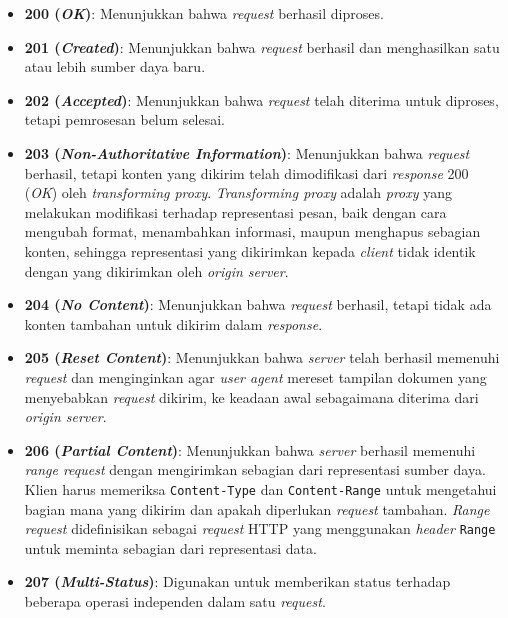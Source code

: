 \begin{itemize}
    \item \textbf{200 (\textit{OK})}: Menunjukkan bahwa \textit{request} berhasil diproses.
  
    \item \textbf{201 (\textit{Created})}: Menunjukkan bahwa \textit{request} berhasil dan menghasilkan satu atau lebih sumber daya baru.
  
    \item \textbf{202 (\textit{Accepted})}: Menunjukkan bahwa \textit{request} telah diterima untuk diproses, tetapi pemrosesan belum selesai.
  
    \item \textbf{203 (\textit{Non-Authoritative Information})}: Menunjukkan bahwa \textit{request} berhasil, tetapi konten yang dikirim telah dimodifikasi dari \textit{response} 200 (\textit{OK}) oleh \textit{transforming proxy}. \textit{Transforming proxy} adalah \textit{proxy} yang melakukan modifikasi terhadap representasi pesan, baik dengan cara mengubah format, menambahkan informasi, maupun menghapus sebagian konten, sehingga representasi yang dikirimkan kepada \textit{client} tidak identik dengan yang dikirimkan oleh \textit{origin server}.
  
    \item \textbf{204 (\textit{No Content})}: Menunjukkan bahwa \textit{request} berhasil, tetapi tidak ada konten tambahan untuk dikirim dalam \textit{response}.
  
    \item \textbf{205 (\textit{Reset Content})}: Menunjukkan bahwa \textit{server} telah berhasil memenuhi \textit{request} dan menginginkan agar \textit{user agent} mereset tampilan dokumen yang menyebabkan \textit{request} dikirim, ke keadaan awal sebagaimana diterima dari \textit{origin server}.
  
    \item \textbf{206 (\textit{Partial Content})}: Menunjukkan bahwa \textit{server} berhasil memenuhi \textit{range request} dengan mengirimkan sebagian dari representasi sumber daya. Klien harus memeriksa \texttt{Content-Type} dan \texttt{Content-Range} untuk mengetahui bagian mana yang dikirim dan apakah diperlukan \textit{request} tambahan. \textit{Range request} didefinisikan sebagai \textit{request} HTTP yang menggunakan \textit{header} \texttt{Range} untuk meminta sebagian dari representasi data.
  
    \item \textbf{207 (\textit{Multi-Status})}: Digunakan untuk memberikan status terhadap beberapa operasi independen dalam satu \textit{request}.~\cite{RFC4918}
  

\end{itemize}
